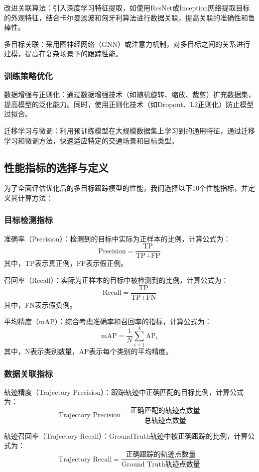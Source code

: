 改进关联算法：引入深度学习特征提取，如使用ResNet或Inception网络提取目标的外观特征，结合卡尔曼滤波和匈牙利算法进行数据关联，提高关联的准确性和鲁棒性。

多目标关联：采用图神经网络（GNN）或注意力机制，对多目标之间的关系进行建模，提高在复杂场景下的跟踪性能。

\subsubsection{训练策略优化}

数据增强与正则化：通过数据增强技术（如随机旋转、缩放、裁剪）扩充数据集，提高模型的泛化能力。同时，使用正则化技术（如Dropout、L2正则化）防止模型过拟合。

迁移学习与微调：利用预训练模型在大规模数据集上学习到的通用特征，通过迁移学习和微调方法，快速适应特定的交通场景和目标类型。


\subsection{性能指标的选择与定义}

为了全面评估优化后的多目标跟踪模型的性能，我们选择以下10个性能指标，并定义其计算方法：

\subsubsection{目标检测指标}
准确率（Precision）：检测到的目标中实际为正样本的比例，计算公式为：
\[\text{Precision} = \frac{\text{TP}}{\text{TP} + \text{FP}}\]
其中，TP表示真正例，FP表示假正例。

召回率（Recall）：实际为正样本的目标中被检测到的比例，计算公式为：
\[\text{Recall} = \frac{\text{TP}}{\text{TP} + \text{FN}}\]
其中，FN表示假负例。

平均精度（mAP）：综合考虑准确率和召回率的指标，计算公式为：
\[\text{mAP} = \frac{1}{N} \sum_{i=1}^{N} \text{AP}_i\]
其中，N表示类别数量，AP表示每个类别的平均精度。

\subsubsection{数据关联指标}
轨迹精度（Trajectory Precision）：跟踪轨迹中正确匹配的目标比例，计算公式为：
\[\text{Trajectory Precision} = \frac{\text{正确匹配的轨迹点数量}}{\text{总轨迹点数量}}\]

轨迹召回率（Trajectory Recall）：GroundTruth轨迹中被正确跟踪的比例，计算公式为：
\[\text{Trajectory Recall} = \frac{\text{正确跟踪的轨迹点数量}}{\text{Ground Truth轨迹点数量}}\]

